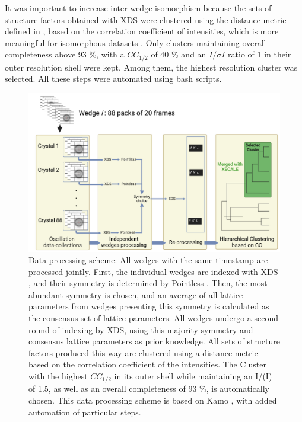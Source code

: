 It was important to increase inter-wedge isomorphism because the sets of structure factors obtained with XDS were clustered using the distance metric defined in \cite{giordanoApplicationHierarchicalCluster2012}, based on the correlation coefficient of intensities, which is more meaningful for isomorphous datasets \parencite{diederichsBetterModelsDiscarding2013}. Only clusters maintaining overall completeness above 93 \%, with a \(CC_{1/2}\) of 40 \% and an \(I/\sigma I\) ratio of 1 in their outer resolution shell were kept. Among them, the highest resolution cluster was selected. All these steps were automated using bash scripts. 
\begin{figure}[H]
  \centering
  \includegraphics[width=\textwidth]{images/cracry/TR-SOX_data-analysis.pdf}
  \hfill
  \caption{Data processing scheme: All wedges with the same timestamp are processed jointly. First, the individual wedges are indexed with XDS \parencite{kabschXDS2010}, and their symmetry is determined by Pointless \parencite{evansIntroductionDataReduction2011}. Then, the most abundant symmetry is chosen, and an average of all lattice parameters from wedges presenting this symmetry is calculated as the consensus set of lattice parameters. All wedges undergo a second round of indexing by XDS, using this majority symmetry and consensus lattice parameters as prior knowledge. All sets of structure factors produced this way are clustered using a distance metric based on the correlation coefficient of the intensities. The Cluster with the highest \(CC_{1/2}\) in its outer shell while maintaining an I/\textsigma(I) of 1.5, as well as an overall completeness of 93 \%, is automatically chosen.  This data processing scheme is based on Kamo \parencite{yamashitaKAMOAutomatedData2018}, with added automation of particular steps.}\label{fig:TR-SOX_proc}
\end{figure}


